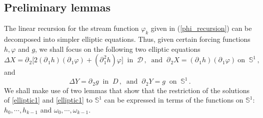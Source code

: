 \documentclass[11pt]{article}
\theoremstyle{plain}
\theoremstyle{definition}
\theoremstyle{definition}
\def\D{{\mathcal D}}
\def\p{\text{\bf\emph{p}}}
\def\p{{\partial\hspace{1pt}}}
\begin{document}
\subsection{Preliminary lemmas}
The linear recursion for the stream function $\varphi_k$ given in (\ref{phi_recursion}) can be decomposed into simpler elliptic equations.  Thus,
given certain forcing functions $h, \varphi$ and $g$, we shall focus on the following two elliptic equations
\begin{equation}\label{elliptic1}
\Delta X = \p_{\!2}\big[2 (\p_{\!1} h) (\p_{\!1} \varphi) + (\p_{\!1}^2 h) \varphi \big] \ \text{ in } \ \D \,, \ \text{ and } \
\p_{\!2} X = (\p_{\!1} h) (\p_{\!1} \varphi) \ \text{on } \ \mathbb{S}^1\,,
\end{equation}
and
\begin{equation}\label{elliptic2}
\Delta Y = \p_{\!2} g \ \text{ in }\ D\,, \ \text{ and } \
\p_{\!2} Y = g \ \text{ on }\ \mathbb{S}^1\,.
\end{equation}
We shall make use of two lemmas that show that the restriction of the solutions of \eqref{elliptic1} and  \eqref{elliptic1} to $\mathbb{S}^1$ can be expressed
in terms of  the functions on $\mathbb{S}^1$: $h_0,\cdots,h_{k-1}$ and $\omega_0,\cdots,\omega_{k-1}$.
\end{document}
